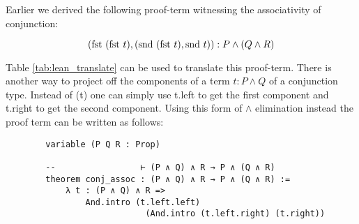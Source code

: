 \documentclass{book}
\begin{document}
    \begin{eg}
        
        Earlier we derived the following proof-term witnessing the associativity of conjunction:

        $$ (\text{fst} \ (\text{fst} \ t), (\text{snd} \ (\text{fst} \ t), \text{snd} \ t)) : P \land (Q \land R) $$

        Table \ref{tab:lean_translate} can be used to translate this proof-term. There is another way to project off the components of a term $t : P \land Q$ of a conjunction type. Instead of (\fst t) one can simply use t.left to get the first component and t.right to get the second component. Using this form of $\land$ elimination instead the proof term can be written as follows: 

        \begin{lstlisting}
        variable (P Q R : Prop)
        
        --                 ⊢ (P ∧ Q) ∧ R → P ∧ (Q ∧ R)
        theorem conj_assoc : (P ∧ Q) ∧ R → P ∧ (Q ∧ R) :=
            λ t : (P ∧ Q) ∧ R =>
                And.intro (t.left.left)
                            (And.intro (t.left.right) (t.right))
        \end{lstlisting}        
    \end{eg}
\end{document}
